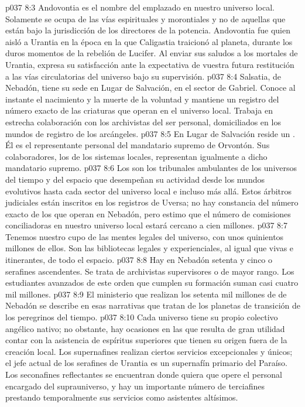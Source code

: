 \vs p037 8:3 Andovontia es el nombre del  emplazado en nuestro universo local. Solamente se ocupa de las vías espirituales y morontiales y no de aquellas que están bajo la jurisdicción de los directores de la potencia. Andovontia fue quien aisló a Urantia en la época en la que Caligastia traicionó al planeta, durante los duros momentos de la rebelión de Lucifer. Al enviar sus saludos a los mortales de Urantia, expresa su satisfacción ante la expectativa de vuestra futura restitución a las vías circulatorias del universo bajo su supervisión.
\vs p037 8:4 Salsatia,  de Nebadón, tiene su sede en Lugar de Salvación, en el sector de Gabriel. Conoce al instante el nacimiento y la muerte de la voluntad y mantiene un registro del número exacto de las criaturas que operan en el universo local. Trabaja en estrecha colaboración con los archivistas del ser personal, domiciliados en los mundos de registro de los arcángeles.
\vs p037 8:5 En Lugar de Salvación reside un . Él es el representante personal del mandatario supremo de Orvontón. Sus colaboradores, los  de los sistemas locales, representan igualmente a dicho mandatario supremo.
\vs p037 8:6 Los  son los tribunales ambulantes de los universos del tiempo y del espacio que desempeñan su actividad desde los mundos evolutivos hasta cada sector del universo local e incluso más allá. Estos árbitros judiciales están inscritos en los registros de Uversa; no hay constancia del número exacto de los que operan en Nebadón, pero estimo que el número de comisiones conciliadoras en nuestro universo local estará cercano a cien millones.
\vs p037 8:7 Tenemos nuestro cupo de  las mentes legales del universo, con unos quinientos millones de ellos. Son las bibliotecas legales y experienciales, al igual que vivas e itinerantes, de todo el espacio.
\vs p037 8:8 Hay en Nebadón setenta y cinco  o serafines ascendentes. Se trata de archivistas supervisores o de mayor rango. Los estudiantes avanzados de este orden que cumplen su formación suman casi cuatro mil millones.
\vs p037 8:9 El ministerio que realizan los setenta mil millones de  de Nebadón se describe en esas narrativas que tratan de los planetas de transición de los peregrinos del tiempo.
\vs p037 8:10 \pc Cada universo tiene su propio colectivo angélico nativo; no obstante, hay ocasiones en las que resulta de gran utilidad contar con la asistencia de espíritus superiores que tienen su origen fuera de la creación local. Los supernafines realizan ciertos servicios excepcionales y únicos; el jefe actual de los serafines de Urantia es un supernafín primario del Paraíso. Los seconafines reflectantes se encuentran donde quiera que opere el personal encargado del suprauniverso, y hay un importante número de terciafines prestando temporalmente sus servicios como asistentes altísimos.
